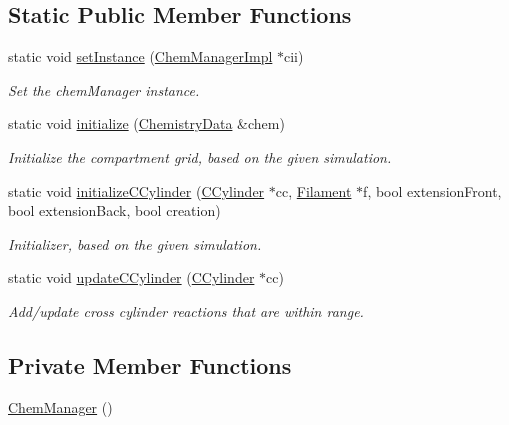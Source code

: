 \subsection*{Static Public Member Functions}
\begin{DoxyCompactItemize}
\item 
static void \hyperlink{classChemManager_a47f584be692f31e39d7598f4f7488796}{set\+Instance} (\hyperlink{classChemManagerImpl}{Chem\+Manager\+Impl} $\ast$cii)
\begin{DoxyCompactList}\small\item\em Set the chem\+Manager instance. \end{DoxyCompactList}\item 
static void \hyperlink{classChemManager_ab3344ccf25c9ea90337e90bd9cf5ebff}{initialize} (\hyperlink{structChemistryData}{Chemistry\+Data} \&chem)
\begin{DoxyCompactList}\small\item\em Initialize the compartment grid, based on the given simulation. \end{DoxyCompactList}\item 
static void \hyperlink{classChemManager_a8c3958ed962520cff0e1d26b92596e68}{initialize\+C\+Cylinder} (\hyperlink{classCCylinder}{C\+Cylinder} $\ast$cc, \hyperlink{classFilament}{Filament} $\ast$f, bool extension\+Front, bool extension\+Back, bool creation)
\begin{DoxyCompactList}\small\item\em Initializer, based on the given simulation. \end{DoxyCompactList}\item 
static void \hyperlink{classChemManager_ae85244eb50a4254d525eb749c44a96a6}{update\+C\+Cylinder} (\hyperlink{classCCylinder}{C\+Cylinder} $\ast$cc)
\begin{DoxyCompactList}\small\item\em Add/update cross cylinder reactions that are within range. \end{DoxyCompactList}\end{DoxyCompactItemize}
\subsection*{Private Member Functions}
\begin{DoxyCompactItemize}
\item 
\hyperlink{classChemManager_ac133ef2eabc4f5f002660f9d69e9c0fb}{Chem\+Manager} ()
\end{DoxyCompactItemize}

